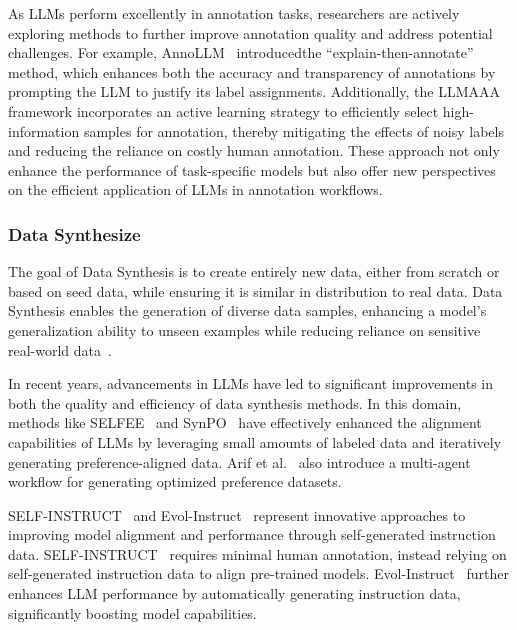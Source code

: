 As LLMs perform excellently in annotation tasks, researchers are actively exploring methods to further improve annotation quality and address potential challenges. For example, AnnoLLM~\cite{he2023annollm} introducedthe ``explain-then-annotate'' method, which enhances both the accuracy and transparency of annotations by prompting the LLM to justify its label assignments. 
Additionally, the LLMAAA~\cite{zhang2023llmaaa} framework incorporates an active learning strategy to efficiently select high-information samples for annotation, thereby mitigating the effects of noisy labels and reducing the reliance on costly human annotation. These approach not only enhance the performance of task-specific models but also offer new perspectives on the efficient application of LLMs in annotation workflows.


\subsubsection{Data Synthesize}
\label{sec:Data Synthesize}
The goal of Data Synthesis is to create entirely new data, either from scratch or based on seed data, while ensuring it is similar in distribution to real data. Data Synthesis enables the generation of diverse data samples, enhancing a model's generalization ability to unseen examples while reducing reliance on sensitive real-world data~\cite{ye2023selfee,dong2024self,arif2024fellowship,wang2022self,kim2024aligning,mendoncca2024soda}.


In recent years, advancements in LLMs have led to significant improvements in both the quality and efficiency of data synthesis methods. In this domain, methods like SELFEE~\cite{ye2023selfee} and SynPO~\cite{dong2024self} have effectively enhanced the alignment capabilities of LLMs by leveraging small amounts of labeled data and iteratively generating preference-aligned data. Arif et al.~\cite{arif2024fellowship} also introduce a multi-agent workflow for generating optimized preference datasets.



SELF-INSTRUCT~\cite{wang2022self} and Evol-Instruct~\cite{xu2023wizardlm,zeng2024automatic} represent innovative approaches to improving model alignment and performance through self-generated instruction data. SELF-INSTRUCT~\cite{wang2022self}  requires minimal human annotation, instead relying on self-generated instruction data to align pre-trained models. Evol-Instruct~\cite{xu2023wizardlm,zeng2024automatic}  further enhances LLM performance by automatically generating instruction data, significantly boosting model capabilities. 


